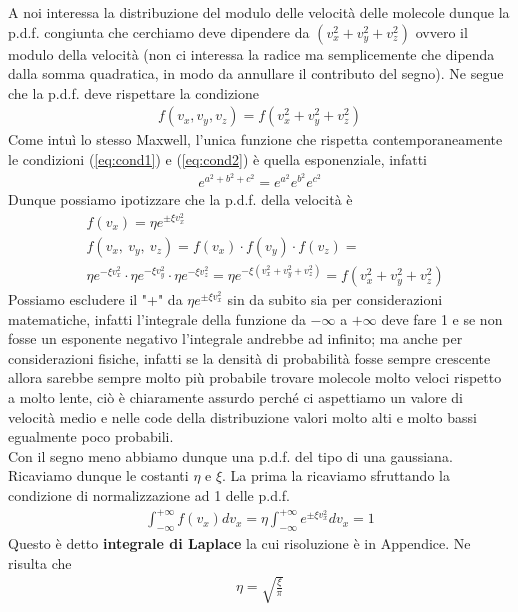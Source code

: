\documentclass[10pt,a4paper]{article}
\begin{document}
A noi interessa la distribuzione del modulo delle velocità delle molecole dunque la p.d.f. congiunta che cerchiamo deve dipendere da $(v_x^2+v_y^2+v_z^2)$ ovvero il modulo della velocità (non ci interessa la radice ma semplicemente che dipenda dalla somma quadratica, in modo da annullare il contributo del segno). Ne segue che la p.d.f. deve rispettare la condizione
\begin{align}\label{eq:cond2}
	f(v_x,v_y,v_z) = f(v_x^2+v_y^2+v_z^2)
\end{align} 
Come intuì lo stesso Maxwell, l'unica funzione che rispetta contemporaneamente le condizioni (\ref{eq:cond1}) e (\ref{eq:cond2}) è quella esponenziale, infatti
\begin{align*} 
	e^{a^2+b^2+c^2}=e^{a^2} e^{b^2} e^{c^2}
\end{align*} 
Dunque possiamo ipotizzare che la p.d.f. della velocità è
\begin{align*} 
	&f(v_x) = \eta e^{\pm \xi v_x^2}\\
	&f(v_x,\ v_y,\ v_z) = f(v_x)\cdot f(v_y)\cdot f(v_z)=\\
	&\eta e^{- \xi v_x^2}\cdot\eta e^{- \xi v_y^2}\cdot\eta e^{- \xi v_z^2}=\eta e^{- \xi (v_x^2+v_y^2+v_z^2)}=f(v_x^2+v_y^2+v_z^2)
\end{align*} 
Possiamo escludere il "+" da \(\eta e^{\pm \xi v_x^2}\) sin da subito sia per considerazioni matematiche, infatti l'integrale della funzione da $- \infty$ a $+ \infty$ deve fare 1 e se non fosse un esponente negativo l'integrale andrebbe ad infinito; ma anche per considerazioni fisiche, infatti se la densità di probabilità fosse sempre crescente allora sarebbe sempre molto più probabile trovare molecole molto veloci rispetto a molto lente, ciò è chiaramente assurdo perché ci aspettiamo un valore di velocità medio e nelle code della distribuzione valori molto alti e molto bassi egualmente poco probabili.\\
Con il segno meno abbiamo dunque una p.d.f. del tipo di una gaussiana. Ricaviamo dunque le costanti $\eta$ e $\xi$. La prima la ricaviamo sfruttando la condizione di normalizzazione ad 1 delle p.d.f.
\begin{align*} 
	\int_{-\infty}^{+\infty} f(v_x)dv_x = \eta \int_{-\infty}^{+\infty} e^{\pm \xi v_x^2} dv_x = 1
\end{align*} 
Questo è detto \textbf{integrale di Laplace} la cui risoluzione è in Appendice. Ne risulta che
\begin{align*} 
	\eta = \sqrt{\frac{\xi}{\pi}}
\end{align*} 
\end{document}
